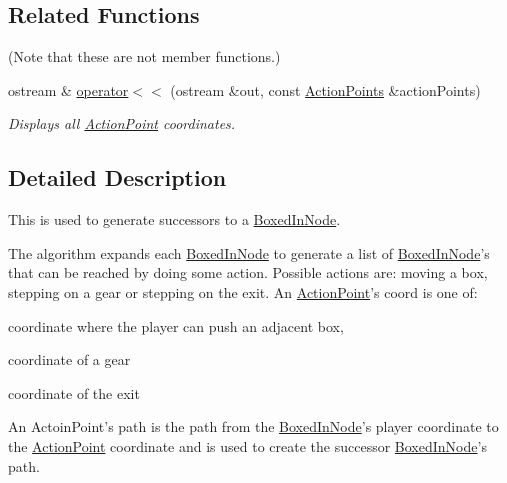 \subsection*{Related Functions}
(Note that these are not member functions.) \begin{DoxyCompactItemize}
\item 
ostream \& \hyperlink{structboxedin_1_1ActionPoint_a0ca0fbc47d662ef723437a71e28c200e}{operator$<$$<$} (ostream \&out, const \hyperlink{namespaceboxedin_ac5c79d0ac76a1a0ac73706f34abe3fc3}{Action\+Points} \&action\+Points)
\begin{DoxyCompactList}\small\item\em Displays all \hyperlink{structboxedin_1_1ActionPoint}{Action\+Point} coordinates. \end{DoxyCompactList}\end{DoxyCompactItemize}


\subsection{Detailed Description}
This is used to generate successors to a \hyperlink{classboxedin_1_1BoxedInNode}{Boxed\+In\+Node}. 

The algorithm expands each \hyperlink{classboxedin_1_1BoxedInNode}{Boxed\+In\+Node} to generate a list of \hyperlink{classboxedin_1_1BoxedInNode}{Boxed\+In\+Node}'s that can be reached by doing some action. Possible actions are\+: moving a box, stepping on a gear or stepping on the exit. An \hyperlink{structboxedin_1_1ActionPoint}{Action\+Point}'s coord is one of\+: \begin{DoxyItemize}
\item coordinate where the player can push an adjacent box, \item coordinate of a gear \item coordinate of the exit\end{DoxyItemize}
An Actoin\+Point's path is the path from the \hyperlink{classboxedin_1_1BoxedInNode}{Boxed\+In\+Node}'s player coordinate to the \hyperlink{structboxedin_1_1ActionPoint}{Action\+Point} coordinate and is used to create the successor \hyperlink{classboxedin_1_1BoxedInNode}{Boxed\+In\+Node}'s path. 


